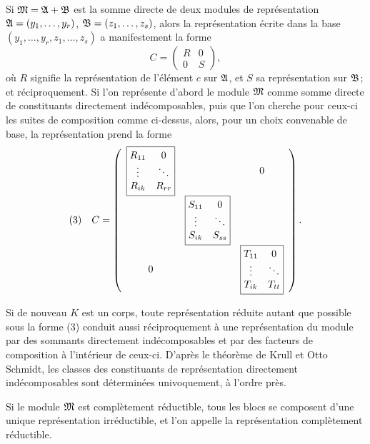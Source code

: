 Si $\mathfrak{M}=\mathfrak{A}+\mathfrak{B}$ est la somme directe de deux modules de représentation $\mathfrak{A}=(y_1,\ldots,y_r)$, $\mathfrak{B}=(z_1,\ldots,z_s)$, alors la représentation écrite dans la base $(y_1,\ldots,y_r,z_1,\ldots,z_s)$ a manifestement la forme
\[
        C=\begin{pmatrix}R&0\\0&S\end{pmatrix},
\]
où $R$ signifie la représentation de l'élément $c$ sur $\mathfrak{A}$, et $S$ sa représentation sur $\mathfrak{B}$; et réciproquement. Si l'on représente d'abord le module $\mathfrak{M}$ comme somme directe de constituants directement indécomposables, puis que l'on cherche pour ceux-ci les suites de composition comme ci-dessus, alors, pour un choix convenable de base, la représentation prend la forme
\[
\begin{array}{@{}r@{\quad}c@{}}
(3)&
C=\left(
\begin{array}{ccc}
\boxed{\begin{matrix}
R_{11}&0\\
\vdots&\ddots\\
R_{ik}&R_{rr}
\end{matrix}} & & 0\\[1.4em]
& \boxed{\begin{matrix}
S_{11}&0\\
\vdots&\ddots\\
S_{ik}&S_{ss}
\end{matrix}} & \\[1.4em]
0 & & \boxed{\begin{matrix}
T_{11}&0\\
\vdots&\ddots\\
T_{ik}&T_{tt}
\end{matrix}}
\end{array}
\right).
\end{array}
\]

Si de nouveau $K$ est un corps, toute représentation réduite autant que possible sous la forme (3) conduit aussi réciproquement à une représentation du module par des sommants directement indécomposables et par des facteurs de composition à l'intérieur de ceux-ci. D'après le théorème de Krull et Otto Schmidt, les classes des constituants de représentation directement indécomposables sont déterminées univoquement, à l'ordre près.

Si le module $\mathfrak{M}$ est complètement réductible, tous les blocs se composent d'une unique représentation irréductible, et l'on appelle la représentation complètement réductible.
